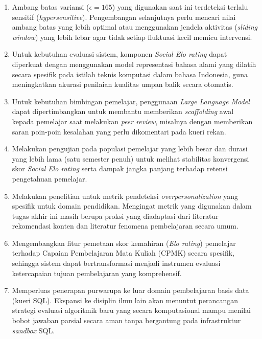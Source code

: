 \begin{enumerate}
    \item Ambang batas variansi ($\epsilon = 165$) yang digunakan saat ini terdeteksi terlalu sensitif (\textit{hypersensitive}). Pengembangan selanjutnya perlu mencari nilai ambang batas yang lebih optimal atau menggunakan jendela aktivitas (\textit{sliding window}) yang lebih lebar agar tidak setiap fluktuasi kecil memicu intervensi.
    \item Untuk kebutuhan evaluasi sistem, komponen \textit{Social Elo rating} dapat diperkuat dengan menggunakan model representasi bahasa alami yang dilatih secara spesifik pada istilah teknis komputasi dalam bahasa Indonesia, guna meningkatkan akurasi penilaian kualitas umpan balik secara otomatis.
    \item Untuk kebutuhan bimbingan pemelajar, penggunaan \textit{Large Language Model} dapat dipertimbangkan untuk membantu memberikan \textit{scaffolding} awal kepada pemelajar saat melakukan \textit{peer review}, misalnya dengan memberikan saran poin-poin kesalahan yang perlu dikomentari pada kueri rekan.
    \item Melakukan pengujian pada populasi pemelajar yang lebih besar dan durasi yang lebih lama (satu semester penuh) untuk melihat stabilitas konvergensi skor \textit{Social Elo rating} serta dampak jangka panjang terhadap retensi pengetahuan pemelajar.
    \item Melakukan penelitian untuk metrik pendeteksi \textit{overpersonalization} yang spesifik untuk domain pendidikan. Mengingat metrik yang digunakan dalam tugas akhir ini masih berupa proksi yang diadaptasi dari literatur rekomendasi konten dan literatur fenomena pembelajaran secara umum.
    \item Mengembangkan fitur pemetaan skor kemahiran (\textit{Elo rating}) pemelajar terhadap Capaian Pembelajaran Mata Kuliah (CPMK) secara spesifik, sehingga sistem dapat bertransformasi menjadi instrumen evaluasi ketercapaian tujuan pembelajaran yang komprehensif.
    \item Memperluas penerapan purwarupa ke luar domain pembelajaran basis data (kueri SQL). Ekspansi ke disiplin ilmu lain akan menuntut perancangan strategi evaluasi algoritmik baru yang secara komputasional mampu menilai bobot jawaban parsial secara aman tanpa bergantung pada infrastruktur \textit{sandbox} SQL.
\end{enumerate}
